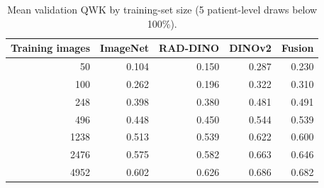 \begin{table}[t]
\centering
\caption{Mean validation QWK by training-set size (5 patient-level draws below 100\%).}
\label{tab:label}
\small
\setlength{\tabcolsep}{4pt}
\begin{tabular}{rrrrr}
\toprule
Training images & ImageNet & RAD-DINO & DINOv2 & Fusion \\
\midrule
50 & 0.104 & 0.150 & 0.287 & 0.230 \\
100 & 0.262 & 0.196 & 0.322 & 0.310 \\
248 & 0.398 & 0.380 & 0.481 & 0.491 \\
496 & 0.448 & 0.450 & 0.544 & 0.539 \\
1238 & 0.513 & 0.539 & 0.622 & 0.600 \\
2476 & 0.575 & 0.582 & 0.663 & 0.646 \\
4952 & 0.602 & 0.626 & 0.686 & 0.682 \\
\bottomrule
\end{tabular}
\end{table}
